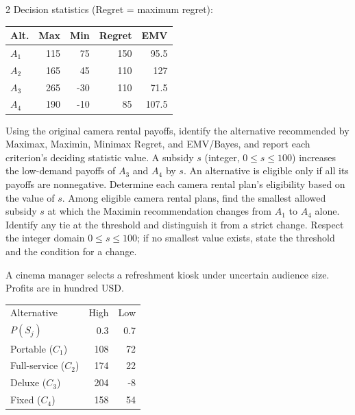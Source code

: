 \begin{multicols}{2}
Decision statistics (Regret = maximum regret):

\vspace{-4mm}
\begin{center}\small\setlength{\tabcolsep}{4pt}
	\begin{tabular}{lrrrr}\toprule
		Alt. & Max & Min & Regret & EMV\\ \midrule
				$A_1$ & 115 & 75 & 150 & 95.5\\
		$A_2$ & 165 & 45 & 110 & 127\\
		$A_3$ & 265 & -30 & 110 & 71.5\\
		$A_4$ & 190 & -10 & 85 & 107.5\\
		\bottomrule
	\end{tabular}
\end{center}
\vspace{-4mm}

\noindent Using the original camera rental payoffs, identify the alternative recommended by Maximax, Maximin, Minimax Regret, and EMV/Bayes, and report each criterion's deciding statistic value.  A subsidy $s$ (integer, $0\leq s\leq100$) increases the low-demand payoffs of $A_3$ and $A_4$ by $s$. An alternative is eligible only if all its payoffs are nonnegative. Determine each camera rental plan's eligibility based on the value of $s$.  Among eligible camera rental plans, find the smallest allowed subsidy $s$ at which the Maximin recommendation changes from $A_1$ to $A_4$ alone. Identify any tie at the threshold and distinguish it from a strict change. Respect the integer domain $0\leq s\leq100$; if no smallest value exists, state the threshold and the condition for a change. 


A cinema manager selects a refreshment kiosk under uncertain audience size. Profits are in hundred USD. \vspace{-3mm}

\begin{center}\small\setlength{\tabcolsep}{4pt}
	\begin{tabular}{lrr}\toprule
		Alternative & High & Low\\
		$P(S_j)$ & 0.3 & 0.7\\ \midrule
				Portable ($C_1$) & 108 & 72\\
		Full-service ($C_2$) & 174 & 22\\
		Deluxe ($C_3$) & 204 & -8\\
		Fixed ($C_4$) & 158 & 54\\
		\bottomrule
	\end{tabular}
\end{center} \vspace{-4mm}


\end{multicols}
